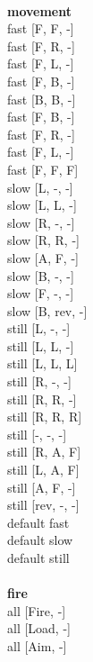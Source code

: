 \ \\ {\bf movement } \\
fast [F, F, -] \\
fast [F, R, -] \\
fast [F, L, -] \\
fast [F, B, -] \\
fast [B, B, -] \\
fast [F, B, -] \\
fast [F, R, -] \\
fast [F, L, -] \\
fast [F, F, F] \\
slow [L, -, -] \\
slow [L, L, -] \\
slow [R, -, -] \\
slow [R, R, -] \\
slow [A, F, -] \\
slow [B, -, -] \\
slow [F, -, -] \\
slow [B, rev, -] \\
still [L, -, -] \\
still [L, L, -] \\
still [L, L, L] \\
still [R, -, -] \\
still [R, R, -] \\
still [R, R, R] \\
still [-, -, -] \\
still [R, A, F] \\
still [L, A, F] \\
still [A, F, -] \\
still [rev, -, -] \\
default fast \\
default slow \\
default still \\
\ \\ {\bf fire } \\
all [Fire, -] \\
all [Load, -] \\
all [Aim, -] \\


